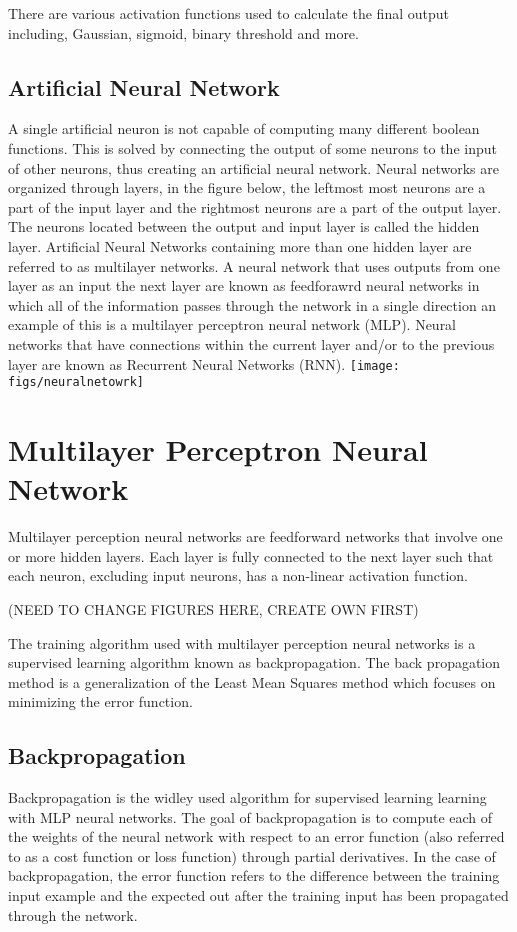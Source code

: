 \documentclass[twocolumn]{webofc}
\begin{document}
There are various activation functions used to calculate the final output including, Gaussian, sigmoid, binary threshold and more. 
\subsection{Artificial Neural Network}\label{sec:formatting}

A single artificial neuron is not capable of computing many different boolean functions. This is solved by connecting the output of some neurons to the input of other neurons, thus creating an artificial neural network. Neural networks are organized through layers, in the figure below, the leftmost most neurons are a part of the input layer and the rightmost neurons are a part of the output layer. The neurons located between the output and input layer is called the hidden layer. Artificial Neural Networks containing more than one hidden layer are referred to as multilayer networks. A neural network that uses outputs from one layer as an input the next layer are known as feedforawrd neural networks in which all of the information passes through the network in a single direction an example of this is a multilayer perceptron neural network (MLP). Neural networks that have connections within the current layer and/or to the previous layer are known as Recurrent Neural Networks (RNN).
\texttt{[image: figs/neuralnetowrk]}
\section{Multilayer Perceptron Neural Network}\label{sec:Models}

Multilayer perception neural networks are feedforward networks that involve one or more hidden layers. Each layer is fully connected to the next layer such that each neuron, excluding input neurons, has a non-linear activation function.

(NEED TO CHANGE FIGURES HERE, CREATE OWN FIRST)

The training algorithm used with multilayer perception neural networks is a supervised learning algorithm known as backpropagation. The back propagation method is a generalization of the Least Mean Squares method which focuses on minimizing the error function.


\subsection{Backpropagation}\label{sec:cap-num}
Backpropagation is the widley used algorithm for supervised learning learning with MLP neural networks. The goal of backpropagation is to compute each of the weights of the neural network with respect to an error function (also referred to as a cost function or loss function) through partial derivatives. In the case of backpropagation, the error function refers to the difference between the training input example and the expected out after the training input has been propagated through the network. 
\end{document}
